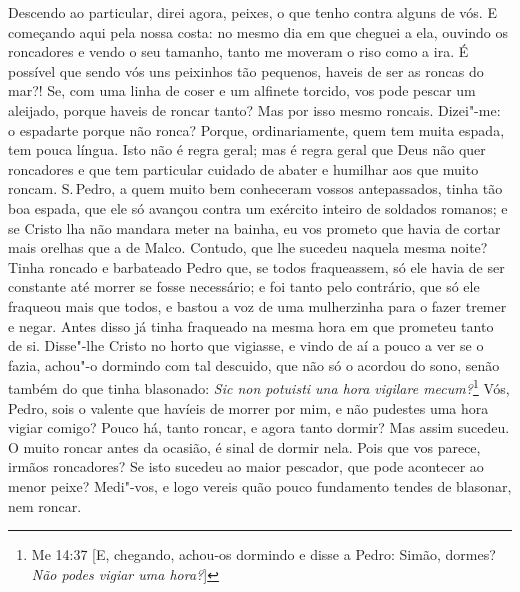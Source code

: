 Descendo ao particular, direi agora, peixes, o que tenho contra alguns
de vós. E começando aqui pela nossa costa: no mesmo dia em que cheguei a
ela, ouvindo os roncadores e vendo o seu tamanho, tanto me moveram o
riso como a ira. É possível que sendo vós uns peixinhos tão pequenos,
haveis de ser as roncas do mar?! Se, com uma linha de coser e um
alfinete torcido, vos pode pescar um aleijado, porque haveis de roncar
tanto? Mas por isso mesmo roncais. Dizei"-me: o espadarte porque não
ronca? Porque, ordinariamente, quem tem muita espada, tem pouca língua.
Isto não é regra geral; mas é regra geral que Deus não quer roncadores e
que tem particular cuidado de abater e humilhar aos que muito roncam.
S.\,Pedro, a quem muito bem conheceram vossos antepassados, tinha tão boa
espada, que ele só avançou contra um exército inteiro de soldados
romanos; e se Cristo lha não mandara meter na bainha, eu vos prometo que
havia de cortar mais orelhas que a de Malco. Contudo, que lhe sucedeu
naquela mesma noite? Tinha roncado e barbateado Pedro que, se todos
fraqueassem, só ele havia de ser constante até morrer se fosse
necessário; e foi tanto pelo contrário, que só ele fraqueou mais que
todos, e bastou a voz de uma mulherzinha para o fazer tremer e negar.
Antes disso já tinha fraqueado na mesma hora em que prometeu tanto de
si. Disse"-lhe Cristo no horto que vigiasse, e vindo de aí a pouco a ver
se o fazia, achou"-o dormindo com tal descuido, que não só o acordou do
sono, senão também do que tinha blasonado: \emph{Sic non potuisti una
hora vigilare mecum?}\footnote{Me 14:37 [E, chegando, achou-os dormindo e disse a Pedro: Simão, dormes? \emph{Não podes vigiar uma hora?}]} Vós, Pedro, sois o valente que havíeis de morrer por mim, e não pudestes uma hora vigiar comigo? Pouco há, tanto
roncar, e agora tanto dormir? Mas assim sucedeu. O muito roncar antes da
ocasião, é sinal de dormir nela. Pois que vos parece, irmãos roncadores?
Se isto sucedeu ao maior pescador, que pode acontecer ao menor peixe?
Medi"-vos, e logo vereis quão pouco fundamento tendes de blasonar, nem
roncar.

